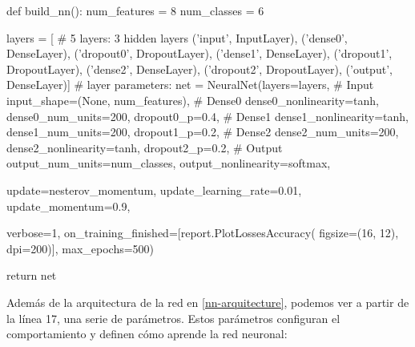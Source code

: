 \begin{python}[frame=none, numbers=left, label={nn-arquitecture}, caption={Arquitectura y parámetros de la red neuronal}]
def build_nn():
    num_features = 8
    num_classes = 6

    layers = [  # 5 layers: 3 hidden layers
              ('input', InputLayer),
              ('dense0', DenseLayer),
              ('dropout0', DropoutLayer),
              ('dense1', DenseLayer),
              ('dropout1', DropoutLayer),
              ('dense2', DenseLayer),
              ('dropout2', DropoutLayer),
              ('output', DenseLayer)]
    # layer parameters:
    net = NeuralNet(layers=layers,
                    # Input
                    input_shape=(None, num_features),
                    # Dense0
                    dense0_nonlinearity=tanh,
                    dense0_num_units=200,
                    dropout0_p=0.4,
                    # Dense1
                    dense1_nonlinearity=tanh,
                    dense1_num_units=200,
                    dropout1_p=0.2,
                    # Dense2
                    dense2_num_units=200,
                    dense2_nonlinearity=tanh,
                    dropout2_p=0.2,
                    # Output
                    output_num_units=num_classes,
                    output_nonlinearity=softmax,

                    update=nesterov_momentum,
                    update_learning_rate=0.01,
                    update_momentum=0.9,

                    verbose=1,
                    on_training_finished=[report.PlotLossesAccuracy(
                                          figsize=(16, 12), dpi=200)],
                    max_epochs=500)

    return net
\end{python}

Además de la arquitectura de la red en \ref{nn-arquitecture}, podemos ver a partir de la línea 17, una
serie de parámetros. Estos parámetros configuran el comportamiento y definen cómo aprende la red neuronal:

